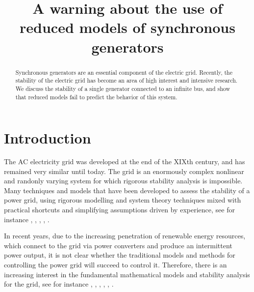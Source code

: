 \documentclass[conference]{IEEEtran}
\begin{document}
\title{A warning about the use of reduced models of synchronous 
       generators }
\author{  \and 
    }

\maketitle

\begin{abstract}
Synchronous generators are an essential component of the electric
grid. Recently, the stability of the electric grid has become an area
of high interest and intensive research. We discuss the stability of a
single generator connected to an infinite bus, and show that reduced
models fail to predict the behavior of this system.
\end{abstract}

\section{Introduction}

The AC electricity grid was developed at the end of the XIXth century,
and has remained very similar until today. The grid is an enormously
complex nonlinear and randonly varying system for which rigorous
stability analysis is impossible. Many techniques and models that have
been developed to assess the stability of a power grid, using rigorous
modelling and system theory techniques mixed with practical shortcuts
and simplifying assumptions driven by experience, see for instance
\cite{Kundur}, \cite{GrSt2014}, \cite{SauerPai1998}, \cite{GOBS:03},
\cite{DoBull:12}.

In recent years, due to the increasing penetration of renewable energy
resources, which connect to the grid via power converters and produce
an intermittent power output, it is not clear whether the traditional
models and methods for controlling the power grid will succeed to
control it. Therefore, there is an increasing interest in the
fundamental mathematical models and stability analysis for the grid,
see for instance \cite{DoBull:12}, \cite{PoDoBu:13}, \cite{CaTa:14},
\cite{NaWe:14}, \cite{NaWe:15}, \cite{DePersiSchaft:16}.
\end{document}
